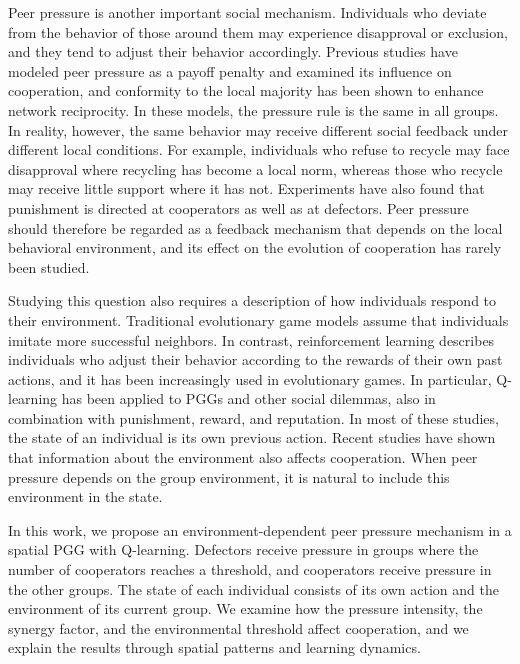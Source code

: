 \documentclass[%
  aip,cha,
  amsmath,amssymb,
  reprint,
  floatfix,
  article-title,
]{revtex4-2}
\begin{document}
Peer pressure is another important social mechanism. Individuals who deviate from the behavior of those around them may experience disapproval or exclusion, and they tend to adjust their behavior accordingly.\cite{asch1952social}
Previous studies have modeled peer pressure as a payoff penalty and examined its influence on cooperation,\cite{yang2015peer,deng2018peer,hu2021peer,gao2023impact,ma2025evolution,xu2026synergistic} and conformity to the local majority has been shown to enhance network reciprocity.\cite{szolnoki2015conformity}
In these models, the pressure rule is the same in all groups.
In reality, however, the same behavior may receive different social feedback under different local conditions.
For example, individuals who refuse to recycle may face disapproval where recycling has become a local norm, whereas those who recycle may receive little support where it has not.\cite{cialdini1990focus}
Experiments have also found that punishment is directed at cooperators as well as at defectors.\cite{herrmann2008antisocial}
Peer pressure should therefore be regarded as a feedback mechanism that depends on the local behavioral environment, and its effect on the evolution of cooperation has rarely been studied.

Studying this question also requires a description of how individuals respond to their environment.
Traditional evolutionary game models assume that individuals imitate more successful neighbors.\cite{szabo2007evolutionary,traulsen2010human}
In contrast, reinforcement learning describes individuals who adjust their behavior according to the rewards of their own past actions,\cite{young2009learning,sutton2018reinforcement} and it has been increasingly used in evolutionary games.\cite{xie2026reinforcement,zheng2026brief}
In particular, Q-learning\cite{watkins1992qlearning} has been applied to PGGs and other social dilemmas,\cite{zheng2024evolution,shi2024model,wang2025spatial,mintz2025evolutionary,li2025cooperation} also in combination with punishment, reward, and reputation.\cite{zhao2024emergence,wang2023synergistic,ren2024interaction,shen2024adaptive,li2026reputation}
In most of these studies, the state of an individual is its own previous action.\cite{wang2022levy,fan2022incorporating,du2026shaping}
Recent studies have shown that information about the environment also affects cooperation.\cite{kleshnina2023effect,lv2025reinforcement,li2025environmental}
When peer pressure depends on the group environment, it is natural to include this environment in the state.

In this work, we propose an environment-dependent peer pressure mechanism in a spatial PGG with Q-learning. Defectors receive pressure in groups where the number of cooperators reaches a threshold, and cooperators receive pressure in the other groups. The state of each individual consists of its own action and the environment of its current group. We examine how the pressure intensity, the synergy factor, and the environmental threshold affect cooperation, and we explain the results through spatial patterns and learning dynamics.
\end{document}
